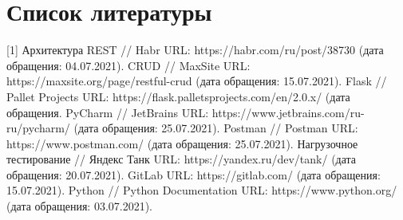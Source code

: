 \documentclass[a4paper, 10pt]{article}
\begin{document}
\clearpage
\newpage
\section*{Список литературы}
[1] \hspace{2mm} Архитектура REST // Habr URL: https://habr.com/ru/post/38730 (дата обращения: 04.07.2021).\vspace{3mm}
\newline [2]\hspace{2mm} CRUD // MaxSite URL: https://maxsite.org/page/restful-crud (дата обращения: 15.07.2021).\vspace{3mm}
\newline [3]\hspace{2mm} Flask // Pallet Projects URL: https://flask.palletsprojects.com/en/2.0.x/ (дата обращения.\vspace{3mm} 
\newline [4]\hspace{2mm} PyCharm // JetBrains URL: https://www.jetbrains.com/ru-ru/pycharm/ (дата обращения: 25.07.2021).\vspace{3mm}
\newline [5]\hspace{2mm} Postman // Postman URL: https://www.postman.com/ (дата обращения: 25.07.2021).\vspace{3mm}
\newline [6]\hspace{2mm} Нагрузочное тестирование // Яндекс Танк URL: https://yandex.ru/dev/tank/ (дата обращения: 20.07.2021).\vspace{3mm}
\newline [7]\hspace{2mm} GitLab URL: https://gitlab.com/ (дата обращения: 15.07.2021).\vspace{3mm}
\newline [8]\hspace{2mm} Python // Python Documentation URL: https://www.python.org/ (дата обращения: 03.07.2021).\vspace{3mm}
\end{document}
